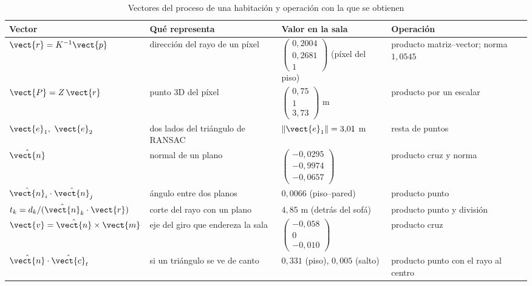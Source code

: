 \begin{table}[htbp]
\caption{Vectores del proceso de una habitación y operación con la que se obtienen}
\label{tab:vec-hab}
\centering\small
\begin{tabular}{@{}p{2.5cm}p{4.0cm}p{3.1cm}p{4.2cm}@{}}
\toprule
Vector & Qué representa & Valor en la sala & Operación \\
\midrule
$\vect{r}=K^{-1}\vect{p}$ & dirección del rayo de un píxel & $\begin{pmatrix} 0{,}2004 \\ 0{,}2681 \\ 1 \end{pmatrix}$ (píxel del piso) & producto matriz--vector; norma $1{,}0545$ \\
$\vect{P}=Z\,\vect{r}$ & punto 3D del píxel & $\begin{pmatrix} 0{,}75 \\ 1 \\ 3{,}73 \end{pmatrix}$ m & producto por un escalar \\
$\vect{e}_1,\ \vect{e}_2$ & dos lados del triángulo de RANSAC & $\lVert\vect{e}_1\rVert=3{,}01$ m & resta de puntos \\
$\hat{\vect{n}}$ & normal de un plano & $\begin{pmatrix} -0{,}0295 \\ -0{,}9974 \\ -0{,}0657 \end{pmatrix}$ & producto cruz y norma \\
$\hat{\vect{n}}_i\cdot\hat{\vect{n}}_j$ & ángulo entre dos planos & $0{,}0066$ (piso--pared) & producto punto \\
$t_k=d_k/(\hat{\vect{n}}_k\cdot\vect{r})$ & corte del rayo con un plano & $4{,}85$ m (detrás del sofá) & producto punto y división \\
$\vect{v}=\hat{\vect{n}}\times\vect{m}$ & eje del giro que endereza la sala & $\begin{pmatrix} -0{,}058 \\ 0 \\ -0{,}010 \end{pmatrix}$ & producto cruz \\
$\hat{\vect{n}}\cdot\hat{\vect{c}}_t$ & si un triángulo se ve de canto & $0{,}331$ (piso), $0{,}005$ (salto) & producto punto con el rayo al centro \\
\bottomrule
\end{tabular}
\end{table}
